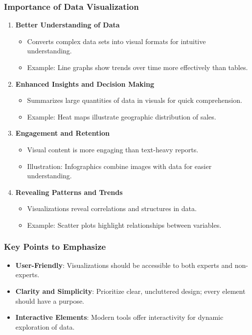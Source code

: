 \documentclass[aspectratio=169]{beamer}
\begin{document}
\begin{frame}[fragile]
    \frametitle{Importance of Data Visualization}
    \begin{enumerate}
        \item \textbf{Better Understanding of Data} 
            \begin{itemize}
                \item Converts complex data sets into visual formats for intuitive understanding.
                \item Example: Line graphs show trends over time more effectively than tables.
            \end{itemize}
        
        \item \textbf{Enhanced Insights and Decision Making}
            \begin{itemize}
                \item Summarizes large quantities of data in visuals for quick comprehension.
                \item Example: Heat maps illustrate geographic distribution of sales.
            \end{itemize}
        
        \item \textbf{Engagement and Retention}
            \begin{itemize}
                \item Visual content is more engaging than text-heavy reports.
                \item Illustration: Infographics combine images with data for easier understanding.
            \end{itemize}
        
        \item \textbf{Revealing Patterns and Trends}
            \begin{itemize}
                \item Visualizations reveal correlations and structures in data.
                \item Example: Scatter plots highlight relationships between variables.
            \end{itemize}
    \end{enumerate}
\end{frame}

\begin{frame}[fragile]
    \frametitle{Key Points to Emphasize}
    \begin{itemize}
        \item \textbf{User-Friendly}: Visualizations should be accessible to both experts and non-experts.
        \item \textbf{Clarity and Simplicity}: Prioritize clear, uncluttered design; every element should have a purpose.
        \item \textbf{Interactive Elements}: Modern tools offer interactivity for dynamic exploration of data.
    \end{itemize}
\end{frame}
\end{document}
